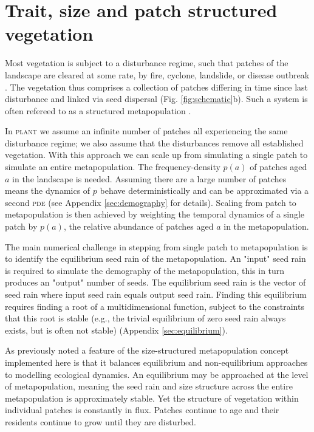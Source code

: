 \documentclass[a4paper,11pt]{article}
\newcommand{\plant}{\textsc{plant}}
\begin{document}
\section{Trait, size and patch structured vegetation}

Most vegetation is subject to a disturbance regime, such that patches of
the landscape are cleared at some rate, by fire, cyclone, landslide, or
disease outbreak
\citep{White-1979, Bormann-1979, Chambers-2013}.
The vegetation thus comprises a collection of patches differing in time
since last disturbance and linked via seed dispersal (Fig.
\ref{fig:schematic}b). Such a system is often refereed to as a
structured metapopulation \citep{Gyllenberg-2001}.

In {\plant} we assume an infinite number of patches all experiencing
the same disturbance regime; we also assume that the disturbances remove
all established vegetation.  With this approach we can scale up from
simulating a single patch to simulate an entire metapopulation.
The frequency-density
\(p(a)\) of patches aged \(a\) in the landscape is needed. Assuming there
are a large number of patches means the dynamics of \(p\) behave
deterministically and can be approximated via a second \textsc{pde}
\citep{ Vonfoerster-1959} (see Appendix
\ref{sec:demography} for
details). Scaling from patch to metapopulation is then achieved by
weighting the temporal dynamics of a single patch by \(p(a)\), the
relative abundance of patches aged \(a\) in the metapopulation.

The main numerical challenge in stepping from single patch to
metapopulation is to identify the equilibrium seed rain of the
metapopulation. An "input" seed rain is required to simulate 
the demography of the metapopulation, this in turn produces an "output" 
number of seeds. The equilibrium seed rain is the vector of seed 
rain where input seed
rain equals output seed rain. Finding this equilibrium requires
finding a root of a multidimensional function, subject to the
constraints that this root is stable (e.g., the trivial equilibrium of
zero seed rain always exists, but is often not stable) (Appendix
\ref{sec:equilibrium}).

As previously noted \citep{Kohyama-1993, Moorcroft-2001, Falster-2011} a
feature of the size-structured metapopulation concept implemented here
is that it balances equilibrium and non-equilibrium approaches to
modelling ecological dynamics. An
equilibrium may be approached at the level of metapopulation, meaning
the seed rain and size structure across the entire metapopulation is
approximately stable. Yet the structure of vegetation within individual
patches is constantly in flux. Patches continue to age and their
residents continue to grow until they are disturbed.
\end{document}
